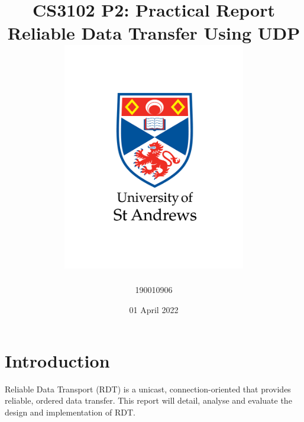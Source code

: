 \documentclass[12pt]{article}
\title{
{CS3102 P2: Practical Report}\\
{\large Reliable Data Transfer Using UDP}\\
{\includegraphics[width=80mm]{images/university-logo.png}}
}
\author{190010906}
\date{01 April 2022}
\begin{document}
\maketitle

\newpage

\section{Introduction}

Reliable Data Transport (RDT) is a unicast, connection-oriented that provides reliable, ordered data transfer. This report will detail, analyse and evaluate the design and implementation of RDT.











\newpage





\newpage

\end{document}
